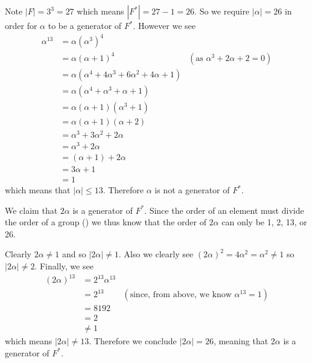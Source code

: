 \begin{questions}
\begin{partquestions}{\roman*}
        \item Note $|F| = 3^3 = 27$ which means $|F^\ast| = 27 - 1 = 26$. So we require $|\alpha| = 26$ in order for $\alpha$ to be a generator of $F^\ast$. However we see
        \begin{align*}
            \alpha^{13} &= \alpha(\alpha^3)^4\\
            &= \alpha(\alpha + 1)^4 & (\text{as }\alpha^3 + 2\alpha + 2 = 0)\\
            &= \alpha(\alpha^4 + 4\alpha^3 + 6\alpha^2 + 4\alpha + 1)\\
            &= \alpha(\alpha^4 + \alpha^3 + \alpha + 1)\\
            &= \alpha(\alpha+1)(\alpha^3+1)\\
            &= \alpha(\alpha+1)(\alpha+2)\\
            &= \alpha^3 + 3\alpha^2 + 2\alpha\\
            &= \alpha^3 + 2\alpha\\
            &= (\alpha + 1) + 2\alpha\\
            &= 3\alpha + 1\\
            &= 1
        \end{align*}
        which means that $|\alpha| \leq 13$. Therefore $\alpha$ is not a generator of $F^\ast$.
        
        \item We claim that $2\alpha$ is a generator of $F^\ast$. Since the order of an element must divide the order of a group () we thus know that the order of $2\alpha$ can only be 1, 2, 13, or 26.
        
        Clearly $2\alpha \neq 1$ and so $|2\alpha| \neq 1$. Also we clearly see $(2\alpha)^2 = 4\alpha^2 = \alpha^2 \neq 1$ so $|2\alpha| \neq 2$. Finally, we see
        \begin{align*}
            (2\alpha)^{13} &= 2^{13}\alpha^{13}\\
            &= 2^{13} & (\text{since, from above, we know }\alpha^{13} = 1)\\
            &= 8192\\
            &= 2\\
            &\neq 1
        \end{align*}
        which means $|2\alpha| \neq 13$. Therefore we conclude $|2\alpha| = 26$, meaning that $2\alpha$ is a generator of $F^\ast$.
    \end{partquestions}


\end{questions}
